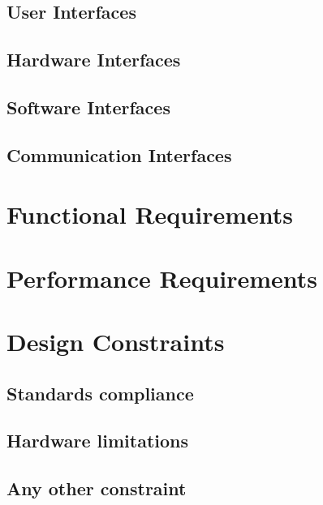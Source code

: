 \documentclass{Configuration_Files/PoliMi3i_thesis}
\begin{document}
    \subsection{User Interfaces}\label{subsec:user_interfaces}

    \subsection{Hardware Interfaces}\label{subsec:hardware_interfaces}

    \subsection{Software Interfaces}\label{subsec:software_interfaces}

    \subsection{Communication Interfaces}\label{subsec:communication_interfaces}


    \section{Functional Requirements}\label{sec:functional_requirements}


    \section{Performance Requirements}\label{sec:performance_requirements}


    \section{Design Constraints}\label{sec:design_constraints}

    \subsection{Standards compliance}\label{subsec:standards_compliance}

    \subsection{Hardware limitations}\label{subsec:hardware_limitations}

    \subsection{Any other constraint}\label{subsec:any_other_constraint}
\end{document}
